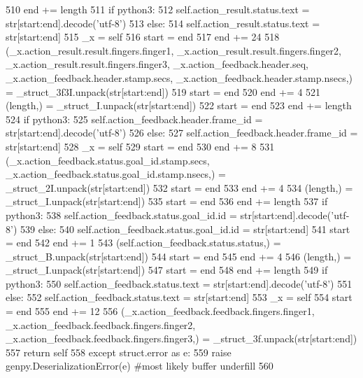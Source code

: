 \begin{DoxyCode}
510       end += length
511       \textcolor{keywordflow}{if} python3:
512         self.action\_result.status.text = str[start:end].decode(\textcolor{stringliteral}{'utf-8'})
513       \textcolor{keywordflow}{else}:
514         self.action\_result.status.text = str[start:end]
515       \_x = self
516       start = end
517       end += 24
518       (\_x.action\_result.result.fingers.finger1, \_x.action\_result.result.fingers.finger2, 
      \_x.action\_result.result.fingers.finger3, \_x.action\_feedback.header.seq, \_x.action\_feedback.header.stamp.secs, 
      \_x.action\_feedback.header.stamp.nsecs,) = \_struct\_3f3I.unpack(str[start:end])
519       start = end
520       end += 4
521       (length,) = \_struct\_I.unpack(str[start:end])
522       start = end
523       end += length
524       \textcolor{keywordflow}{if} python3:
525         self.action\_feedback.header.frame\_id = str[start:end].decode(\textcolor{stringliteral}{'utf-8'})
526       \textcolor{keywordflow}{else}:
527         self.action\_feedback.header.frame\_id = str[start:end]
528       \_x = self
529       start = end
530       end += 8
531       (\_x.action\_feedback.status.goal\_id.stamp.secs, \_x.action\_feedback.status.goal\_id.stamp.nsecs,) = 
      \_struct\_2I.unpack(str[start:end])
532       start = end
533       end += 4
534       (length,) = \_struct\_I.unpack(str[start:end])
535       start = end
536       end += length
537       \textcolor{keywordflow}{if} python3:
538         self.action\_feedback.status.goal\_id.id = str[start:end].decode(\textcolor{stringliteral}{'utf-8'})
539       \textcolor{keywordflow}{else}:
540         self.action\_feedback.status.goal\_id.id = str[start:end]
541       start = end
542       end += 1
543       (self.action\_feedback.status.status,) = \_struct\_B.unpack(str[start:end])
544       start = end
545       end += 4
546       (length,) = \_struct\_I.unpack(str[start:end])
547       start = end
548       end += length
549       \textcolor{keywordflow}{if} python3:
550         self.action\_feedback.status.text = str[start:end].decode(\textcolor{stringliteral}{'utf-8'})
551       \textcolor{keywordflow}{else}:
552         self.action\_feedback.status.text = str[start:end]
553       \_x = self
554       start = end
555       end += 12
556       (\_x.action\_feedback.feedback.fingers.finger1, \_x.action\_feedback.feedback.fingers.finger2, 
      \_x.action\_feedback.feedback.fingers.finger3,) = \_struct\_3f.unpack(str[start:end])
557       \textcolor{keywordflow}{return} self
558     \textcolor{keywordflow}{except} struct.error \textcolor{keyword}{as} e:
559       \textcolor{keywordflow}{raise} genpy.DeserializationError(e) \textcolor{comment}{#most likely buffer underfill}
560 
\end{DoxyCode}
